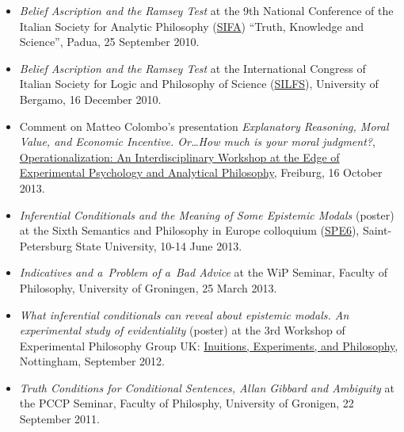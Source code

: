 \documentclass[a4paper,12pt]{article}
\begin{document}
\begin{small}
\begin{itemize}
  \item \emph{Belief Ascription and the Ramsey Test} at the 9th
    National Conference of the Italian Society for Analytic Philosophy
    (\href{http://www.filosofia.lettere.unipd.it/analitica/sifa2010/}{SIFA})
    ``Truth, Knowledge and Science'', Padua, 25 September
    2010. %

    
  \item \emph{Belief Ascription and the Ramsey Test} at the
    International Congress of Italian Society for Logic and Philosophy
    of Science
    (\href{http://dinamico2.unibg.it/silfs/convegno2010.htm}{SILFS}),
    University of Bergamo, 16 December
    2010. %
  \end{itemize}
  

  \begin{itemize}

\item Comment on Matteo Colombo's presentation \emph{Explanatory Reasoning, Moral Value, and Economic Incentive. Or\ldots How much is your moral judgment?}, 
    \href{http://www.psychologie.uni-freiburg.de/Members/singmann/operational2013}{Operationalization: An Interdisciplinary Workshop at the Edge of Experimental Psychology and Analytical Philosophy}, Freiburg, 16 October 2013.

  \item \emph{Inferential Conditionals and the Meaning of Some
      Epistemic Modals} (poster) at the Sixth Semantics and Philosophy
    in Europe colloquium
    (\href{http://spe6conference.wordpress.com}{SPE6}),
    Saint-Petersburg State University, 10-14 June 2013.
    
  \item \emph{Indicatives and a~Problem of a~Bad Advice} at the WiP
    Seminar, Faculty of Philosophy, University of Groningen, 25 March
    2013.
    
  \item \emph{What inferential conditionals can reveal about epistemic
      modals. An experimental study of evidentiality} (poster) at the
    3rd Workshop of Experimental Philosophy Group UK:
    \href{https://www.nottingham.ac.uk/philosophy/research/conferences/workshop-intuitions-experimentsandphilosophy.aspx}{Inuitions,
      Experiments, and Philosophy}, Nottingham, September 2012.

  \item \emph{Truth Conditions for Conditional Sentences, Allan
      Gibbard and Ambiguity} at the PCCP Seminar, Faculty of
    Philosphy, University of Gronigen, 22 September 2011.
    

\end{itemize}
\end{small}
\end{document}
